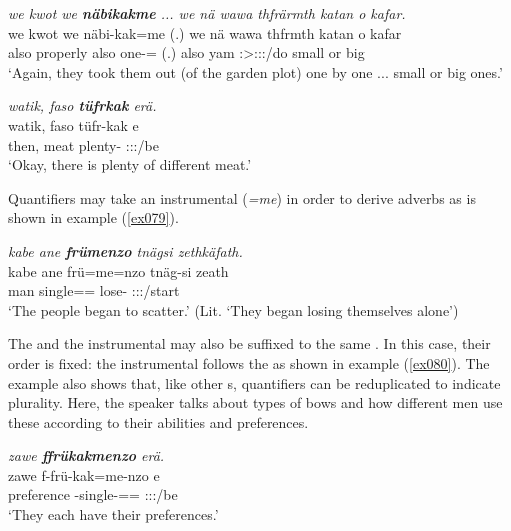\begin{exe}
	\ex \emph{we kwot we \textbf{näbikakme} ... we nä wawa thfrärmth katan o kafar.}\\
	\gll we kwot we näbi-kak=me (.) we nä wawa thfrmth katan o kafar\\
	also properly also one-\Distr=\Ins{} (.) also \Indf{} yam \Stpl:\Sbj>\Stpl:\Obj:\Pst:\Dur/do small or big\\
	\trans `Again, they took them out (of the garden plot) one by one ... small or big ones.'
	\label{ex742}
\end{exe}
\begin{exe}
	\ex \emph{watik, faso \textbf{tüfrkak} erä.}\\
	\gll watik, faso tüfr-kak e\\
	then, meat plenty-\Distr{} \Stpl:\Sbj:\Nonpast:\Ipfv/be\\
	\trans `Okay, there is plenty of different meat.'
	\label{ex078}
\end{exe}

Quantifiers may take an instrumental  (\emph{=me}) in order to derive adverbs as is shown in example (\ref{ex079}).

\begin{exe}
	\ex \emph{kabe ane \textbf{frümenzo} tnägsi zethkäfath.}\\
	\gll kabe ane frü=me=nzo tnäg-si zeath\\
	man \Dem{} single=\Ins=\Only{} lose-\Nmlz{} \Stpl{}:\Sbj:\Pst:\Ipfv{}/start\\
	\trans `The people began to scatter.' (Lit. `They began losing themselves alone')\\
	\label{ex079}
\end{exe}

The  and the instrumental may also be suffixed to the same . In this case, their order is fixed: the instrumental follows the  as shown in example (\ref{ex080}). The example also shows that, like other s, quantifiers can be reduplicated to indicate plurality. Here, the speaker talks about types of bows and how different men use these according to their abilities and preferences.

\begin{exe}
	\ex \emph{zawe \textbf{ffrükakmenzo} erä.}\\
	\gll zawe f-frü-kak=me-nzo e\\
	preference \Redup-single-\Distr=\Ins=\Only{} \Stpl:\Sbj:\Nonpast:\Ipfv/be\\
	\trans `They each have their preferences.'
	\label{ex080}
\end{exe}

